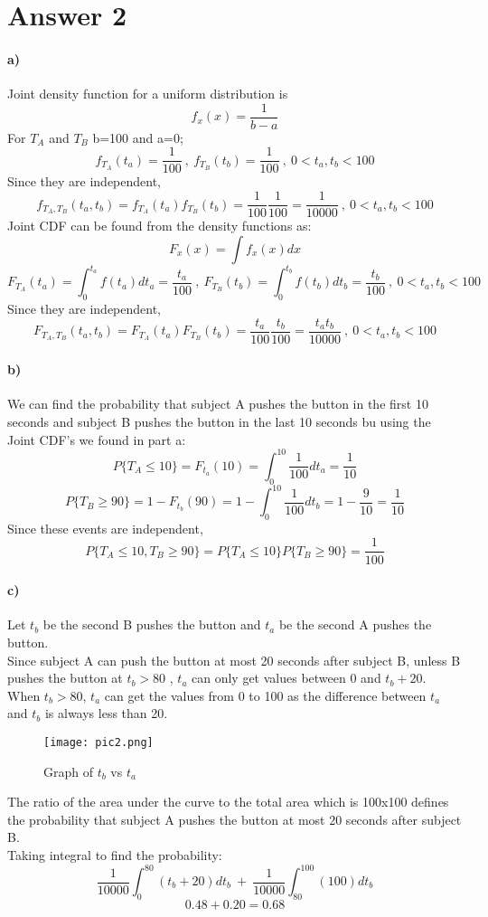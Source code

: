 \documentclass[12pt]{article}
\begin{document}
\section*{Answer 2}
\paragraph{a)}
Joint density function for a uniform distribution is 
\[f_x(x)=\frac{1}{b-a}\]
For $T_A$ and $T_B$ b=100 and a=0;
\[f_{T_A}(t_a)=\frac{1}{100} \ , \ f_{T_B}(t_b)=\frac{1}{100} \ , \ 0<t_a,t_b<100\]
Since they are independent, 
\[f_{T_A,T_B}(t_a,t_b)=f_{T_A}(t_a)f_{T_B}(t_b)=\frac{1}{100}\frac{1}{100}=\frac{1}{10000} \ , \ 0<t_a,t_b<100\] 
Joint CDF can be found from the density functions as:
\[F_x(x)=\int f_x(x)dx\]
\[F_{T_A}(t_a)=\int_{0}^{t_a}f(t_a)dt_a=\frac{t_a}{100} \ , \ F_{T_B}(t_b)=\int_{0}^{t_b}f(t_b)dt_b= \frac{t_b}{100} \ , \ 0<t_a,t_b<100\]
Since they are independent, 
\[F_{T_A,T_B}(t_a,t_b)=F_{T_A}(t_a)F_{T_B}(t_b)=\frac{t_a}{100}\frac{t_b}{100}=\frac{t_at_b}{10000} \ , \ 0<t_a,t_b<100\] 
\paragraph{b)}
We can find the probability that subject A pushes the button in the first 10 seconds and subject B pushes the button in the last 10 seconds bu using the Joint CDF's we found in part a:
\[P\{T_A \leq 10\}=F_{t_a}(10)=\int_{0}^{10}\frac{1}{100}dt_a=\frac{1}{10}\]
\[P\{T_B \geq 90\}=1-F_{t_b}(90)=1-\int_{0}^{10}\frac{1}{100}dt_b=1-\frac{9}{10}=\frac{1}{10}\]
Since these events are independent, 
\[P\{T_A \leq 10 , T_B\geq 90\}=P\{T_A \leq 10\}P\{T_B \geq 90\}=\frac{1}{100}\]
\paragraph{c)}
Let $t_b$ be the second B pushes the button and $t_a$ be the second A pushes the button.\\
Since subject A can push the button at most 20 seconds after subject B, unless B pushes the button at $t_b > 80$ ,  $t_a$ can only get values between 0 and $t_b+20$. When $t_b > 80$, $t_a$ can get the values from 0 to 100 as the difference between $t_a$ and $t_b$ is always less than 20. 
\begin{center}
        \begin{figure}[H]
        \hspace{40mm}\texttt{[image: pic2.png]}
        \caption{Graph of $t_b$ vs $t_a$}
        \label{fig:htgraph}
    \end{figure}
\end{center}
The ratio of the area under the curve to the total area which is 100x100 defines the probability that subject A pushes the button at most 20 seconds after subject B. \\
Taking integral to find the probability:
\[\frac{1}{10000}\int_{0}^{80}(t_b+20)dt_b \ + \  \frac{1}{10000}\int_{80}^{100}(100)dt_b\]
\[0.48+0.20=0.68\]
\end{document}
